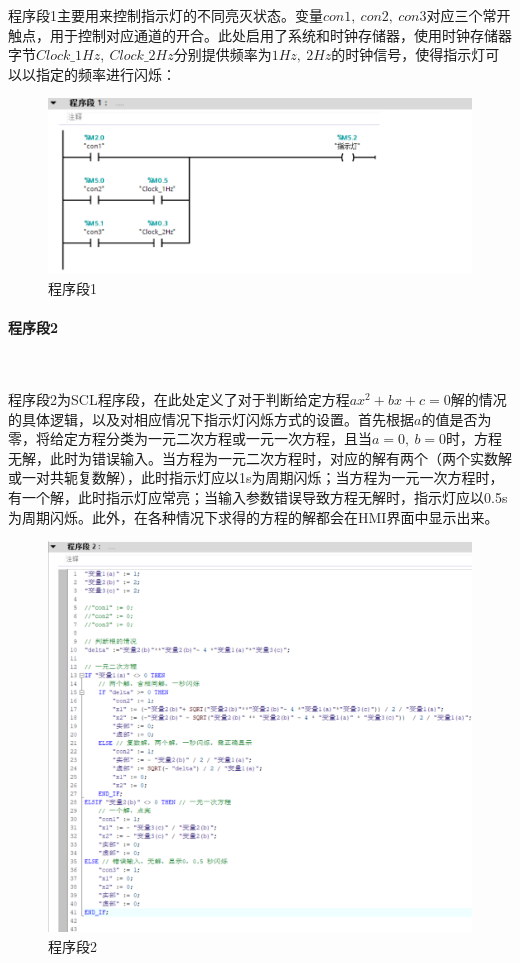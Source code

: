 \documentclass[UTF8]{article}
\begin{document}
程序段1主要用来控制指示灯的不同亮灭状态。变量$con1,\ con2,\ con3$对应三个常开触点，用于控制对应通道的开合。此处启用了系统和时钟存储器，使用时钟存储器字节$Clock\_1Hz,\ Clock\_2Hz$分别提供频率为$1Hz,\ 2Hz$的时钟信号，使得指示灯可以以指定的频率进行闪烁：
\begin{figure}[H]
    \centering %
    \includegraphics[width=.8\textwidth]{figure/程序段1.png} 
    \caption{程序段1} %
\end{figure}

\paragraph{程序段2}~{}

程序段2为SCL程序段，在此处定义了对于判断给定方程$ax^2 + bx + c = 0$解的情况的具体逻辑，以及对相应情况下指示灯闪烁方式的设置。首先根据$a$的值是否为零，将给定方程分类为一元二次方程或一元一次方程，且当$a= 0,\ b = 0$时，方程无解，此时为错误输入。当方程为一元二次方程时，对应的解有两个（两个实数解或一对共轭复数解），此时指示灯应以1s为周期闪烁；当方程为一元一次方程时，有一个解，此时指示灯应常亮；当输入参数错误导致方程无解时，指示灯应以0.5s为周期闪烁。此外，在各种情况下求得的方程的解都会在HMI界面中显示出来。
\begin{figure}[H]
    \centering %
    \includegraphics[width=.8\textwidth]{figure/程序段2.png} 
    \caption{程序段2} %
\end{figure}
\end{document}
